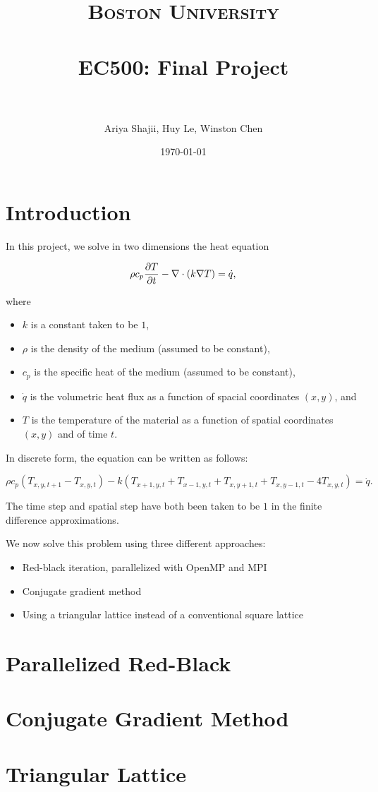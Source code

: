 \documentclass[paper=a4, fontsize=11pt]{scrartcl} %
\title{	
\normalfont \normalsize 
\textsc{Boston University} \\ [25pt] %
\horrule{0.5pt} \\[0.4cm] %
\huge EC500: Final Project \\
\horrule{2pt} \\[0.5cm] %
}
\author{Ariya Shajii, Huy Le, Winston Chen}
\date{\normalsize\today}
\numberwithin{equation}{section} %
\numberwithin{figure}{section} %
\numberwithin{table}{section} %
\begin{document}
\maketitle


\section{Introduction}

In this project, we solve in two dimensions the heat equation

\begin{equation}
	\rho c_p {\partial T \over \partial t} - \nabla \cdot (k \nabla T) = \dot{q},
\end{equation}

where

\begin{itemize}
	\item $k$ is a constant taken to be $1$,
	\item $\rho$ is the density of the medium (assumed to be constant),
	\item $c_p$ is the specific heat of the medium (assumed to be constant),
	\item $\dot{q}$ is the volumetric heat flux as a function of spacial coordinates $(x,y)$, and
	\item $T$ is the temperature of the material as a function of spatial coordinates $(x,y)$ and of time $t$.
\end{itemize}

In discrete form, the equation can be written as follows:

\begin{equation}
	\rho c_p (T_{x,y,t+1} - T_{x,y,t}) -
	k (T_{x+1,y,t} + T_{x-1,y,t} + T_{x,y+1,t} + T_{x,y-1,t} - 4T_{x,y,t}) = \dot{q}.
\end{equation}

The time step and spatial step have both been taken to be $1$ in the finite difference approximations. \linebreak

We now solve this problem using three different approaches:

\begin{itemize}
	\item Red-black iteration, parallelized with OpenMP and MPI
	\item Conjugate gradient method
	\item Using a triangular lattice instead of a conventional square lattice
\end{itemize}


\section{Parallelized Red-Black}


\section{Conjugate Gradient Method}


\section{Triangular Lattice}
\end{document}
